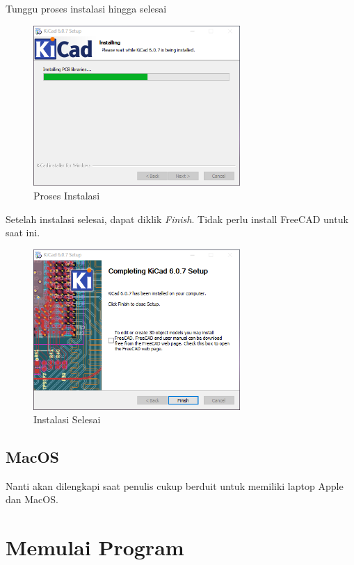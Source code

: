 \documentclass[12pt]{book}
\begin{document}
	\newpage
	Tunggu proses instalasi hingga selesai

	\begin{figure}[!ht]
		\centering
		\includegraphics[width=0.7\textwidth]{images/installations/kicad_install_2}
		\caption{Proses Instalasi}
	\end{figure}

	Setelah instalasi selesai, dapat diklik \textit{Finish}.
	Tidak perlu install FreeCAD untuk saat ini.

	\begin{figure}[!ht]
		\centering
		\includegraphics[width=0.7\textwidth]{images/installations/kicad_install_3}
		\caption{Instalasi Selesai}
	\end{figure}

	\newpage
	\subsection{MacOS}
	Nanti akan dilengkapi saat penulis cukup berduit untuk memiliki laptop Apple dan MacOS.

	\section{Memulai Program}
\end{document}
